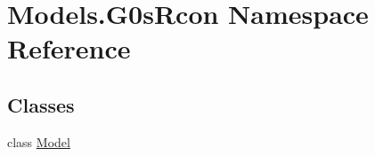\hypertarget{namespace_models_1_1_g0s_rcon}{\section{Models.\-G0s\-Rcon Namespace Reference}
\label{namespace_models_1_1_g0s_rcon}
}
\subsection*{Classes}
\begin{DoxyCompactItemize}
\item 
class \hyperlink{class_models_1_1_g0s_rcon_1_1_model}{Model}
\end{DoxyCompactItemize}
